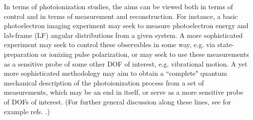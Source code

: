 In terms of photoionization studies, the aims can be viewed both in terms of control and in terms of measurement and reconstruction. For instance, a basic photoelectron imaging experiment may seek to measure photoelectron energy and lab-frame (LF) angular distributions from a given system. A more sophisticated experiment may seek to control these observables in some way, e.g. via state-preparation or ionizing pulse polarization, or may seek to use these measurements as a sensitive probe of some other DOF of interest, e.g. vibrational motion. A yet more sophisticated methodology may aim to obtain a ``complete" quantum mechanical description of the photoionization process from a set of measurements, which may be an end in itself, or serve as a more sensitive probe of DOFs of interest. (For further general discussion along these lines, see for example refs. \cite{hockett2018QMP1,kleinpoppen2013perfect,Reid2012,Stolow2008}.)